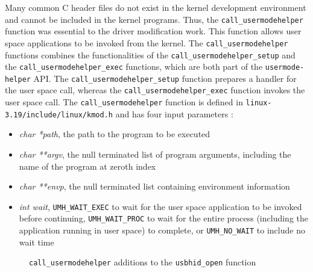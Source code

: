 \documentclass[pagenumbers]{ieee}
\begin{document}
Many common C header files do not exist in the kernel development environment and cannot be included in the kernel programs. Thus, the \texttt{call\_usermodehelper} function was essential to the driver modification work. This function allows user space applications to be invoked from the kernel. The \texttt{call\_usermodehelper} functions combines the functionalities of the \texttt{call\_usermodehelper\_setup} and the \texttt{call\_usermodehelper\_exec} functions, which are both part of the \texttt{usermode-helper} API. The \texttt{call\_usermodehelper\_setup} function prepares a handler for the user space call, whereas the \texttt{call\_usermodehelper\_exec} function invokes the user space call. The \texttt{call\_usermodehelper} function is defined in \texttt{linux-3.19/include/linux/kmod.h} and has four input parameters \cite{ibm}:
\begin{itemize}
\item \textit{char *path}, the path to the program to be executed
\item \textit{char **argv}, the null terminated list of program arguments, including the name of the program at zeroth index
\item \textit{char **envp}, the null terminated list containing environment information 
\item \textit{int wait}, \texttt{UMH\_WAIT\_EXEC} to wait for the user space application to be invoked before continuing, \texttt{UMH\_WAIT\_PROC} to wait for the entire process (including the application running in user space) to complete, or \texttt{UMH\_NO\_WAIT} to include no wait time
\end{itemize}

\begin{figure}[H]
   \caption{\texttt{call\_usermodehelper} additions to the \texttt{usbhid\_open} function}
   \label{fig:usermodehelper_code}
\end{figure}
\end{document}
